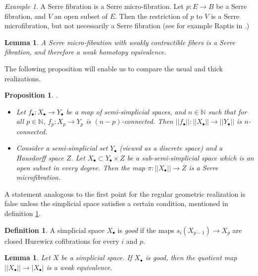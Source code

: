 \documentclass[12pt]{amsart}
\theoremstyle{plain}
\newtheorem{prop}[teo]{Proposition}
\newtheorem{lem}[teo]{Lemma}
\theoremstyle{definition}
\newtheorem{defi}[teo]{Definition}
\theoremstyle{remark}
\newtheorem{exemple}[teo]{Example}
\begin{document}
\begin{exemple}
    A Serre fibration is a Serre micro-fibration.
    Let $p:E\rightarrow B$ be a Serre fibration, and $V$ an open subset of $E$. Then the restriction of $p$ to $V$ is a Serre microfibration, but not necessarily a Serre fibration (see for example Raptis in \cite{raptis}.)
\end{exemple}

\begin{lem}\cite[Lemma~2.2]{weisslemma}
A Serre micro-fibration with weakly contractible fibers is a Serre fibration, and therefore a weak homotopy equivalence.
\end{lem}

The following proposition will enable us to compare the usual and thick realizations.
\begin{prop}\label{levelwisereal}\cite[Propositions~2.7-2.8]{grwI}.
\begin{itemize}
\item[$\bullet$] Let $f_\bullet:X_\bullet\rightarrow Y_\bullet$ be a map of semi-simplicial spaces, and $n\in\mathbb{N}$ such that for all $p\in\mathbb{N}$, $f_p:X_p\rightarrow Y_p$ is $(n-p)$-connected. Then $||f_\bullet||:||X_\bullet||\rightarrow ||Y_\bullet||$ is $n$-connected.
\item[$\bullet$] Consider a semi-simplicial set $Y_\bullet$ (viewed as a discrete space) and a Hausdorff space $Z$. Let $X_\bullet \subset Y_\bullet \times Z$ be a sub-semi-simplicial space which is an open subset in every degree.
Then the map $\pi:||X_\bullet|| \rightarrow Z$ is a Serre microfibration.
\end{itemize}
\end{prop}
A statement analogous to the first point for the regular geometric realization is false unless the simplicial space satisfies a certain condition, mentioned in definition \ref{proper}.

\begin{defi}\cite[Definition~A.4]{segal74}\label{proper}
A simplicial space $X_\bullet$ is \textit{good} if the maps $s_i(X_{p-1})\rightarrow X_p$ are closed Hurewicz cofibrations for every $i$ and $p$.
\end{defi}

\begin{lem}\label{realizations}\cite[Proposition~A.1.(iv)]{segal74}
Let $X$ be a simplicial space. If $X_\bullet$ is good, then the quotient map $||X_\bullet||\rightarrow |X_\bullet|$ is a weak equivalence.
\end{lem}
\end{document}
